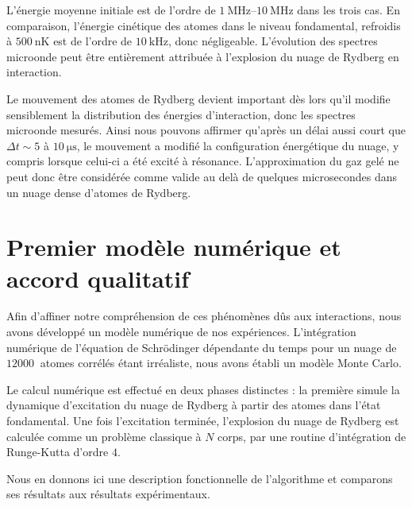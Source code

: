 %
L'énergie moyenne initiale est de l'ordre de $\SIrange{1}{10}{\MHz}$ dans les trois cas.
En comparaison, l'énergie cinétique des atomes dans le niveau fondamental, refroidis à $\SI{500}{\nano\K}$ est de l'ordre de $\SI{10}{\kHz}$, donc négligeable.
L'évolution des spectres microonde peut être entièrement attribuée à l'explosion du nuage de Rydberg en interaction.

Le mouvement des atomes de Rydberg devient important dès lors qu'il modifie sensiblement la distribution des énergies d'interaction, donc les spectres microonde mesurés.
Ainsi nous pouvons affirmer qu'après un délai aussi court que $\Delta t \sim \num{5}$ à $\SI{10}{\us}$, le mouvement a modifié la configuration énergétique du nuage, y compris lorsque celui-ci a été excité à résonance.
L'approximation du \og gaz gelé \fg{} ne peut donc être considérée comme valide au delà de quelques microsecondes dans un nuage dense d'atomes de Rydberg.


\section{Premier modèle numérique et accord qualitatif}
\noindent Afin d'affiner notre compréhension de ces phénomènes dûs aux interactions, nous avons développé un modèle numérique de nos expériences.
L'intégration numérique de l'équation de Schrödinger dépendante du temps pour un nuage de $\SI{12000}{}$ atomes corrélés étant irréaliste, nous avons établi un modèle Monte Carlo.

Le calcul numérique est effectué en deux phases distinctes : la première simule la dynamique d'excitation du nuage de Rydberg à partir des atomes dans l'état fondamental.
Une fois l'excitation terminée, l'explosion du nuage de Rydberg est calculée comme un problème classique à $N$ corps, par une routine d'intégration de Runge-Kutta d'ordre $4$.

Nous en donnons ici une description fonctionnelle de l'algorithme et comparons ses résultats aux résultats expérimentaux.

